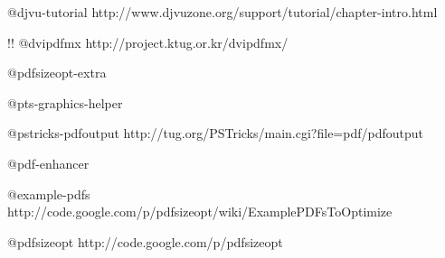 \documentclass{ltugproc}
\begin{document}
@djvu-tutorial{
http://www.djvuzone.org/support/tutorial/chapter-intro.html
}

!!
@dvipdfmx{
http://project.ktug.or.kr/dvipdfmx/
}

@pdfsizeopt-extra{
}

@pts-graphics-helper{
}

@pstricks-pdfoutput{
http://tug.org/PSTricks/main.cgi?file=pdf/pdfoutput
}

@pdf-enhancer{
}

@example-pdfs{
http://code.google.com/p/pdfsizeopt/wiki/ExamplePDFsToOptimize
}

@pdfsizeopt{
http://code.google.com/p/pdfsizeopt
}
\end{document}
